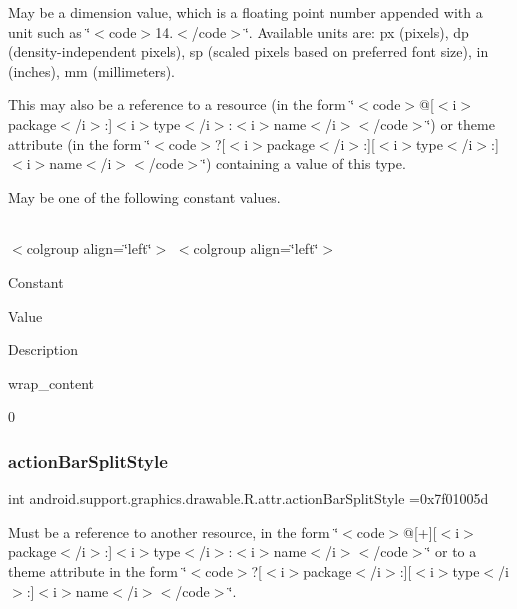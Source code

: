 May be a dimension value, which is a floating point number appended with a unit such as \char`\"{}$<$code$>$14.\+5sp$<$/code$>$\char`\"{}. Available units are\+: px (pixels), dp (density-\/independent pixels), sp (scaled pixels based on preferred font size), in (inches), mm (millimeters). 

This may also be a reference to a resource (in the form \char`\"{}$<$code$>$@\mbox{[}$<$i$>$package$<$/i$>$\+:\mbox{]}$<$i$>$type$<$/i$>$\+:$<$i$>$name$<$/i$>$$<$/code$>$\char`\"{}) or theme attribute (in the form \char`\"{}$<$code$>$?\mbox{[}$<$i$>$package$<$/i$>$\+:\mbox{]}\mbox{[}$<$i$>$type$<$/i$>$\+:\mbox{]}$<$i$>$name$<$/i$>$$<$/code$>$\char`\"{}) containing a value of this type. 

May be one of the following constant values.

\tabulinesep=1mm
\begin{longtabu} spread 0pt [c]{*{0}{|X[-1]}|}
\hline
\end{longtabu}
$<$colgroup align=\char`\"{}left\char`\"{}$>$ $<$colgroup align=\char`\"{}left\char`\"{}$>$ 

Constant

Value

Description 

{\ttfamily wrap\+\_\+content}

0\mbox{\label{classandroid_1_1support_1_1graphics_1_1drawable_1_1R_1_1attr_a21166b60d259bd01f92e065e54359fa1}} 
\subsubsection{\texorpdfstring{action\+Bar\+Split\+Style}{actionBarSplitStyle}}
{\footnotesize\ttfamily int android.\+support.\+graphics.\+drawable.\+R.\+attr.\+action\+Bar\+Split\+Style =0x7f01005d\hspace{0.3cm}{\ttfamily [static]}}

Must be a reference to another resource, in the form \char`\"{}$<$code$>$@\mbox{[}+\mbox{]}\mbox{[}$<$i$>$package$<$/i$>$\+:\mbox{]}$<$i$>$type$<$/i$>$\+:$<$i$>$name$<$/i$>$$<$/code$>$\char`\"{} or to a theme attribute in the form \char`\"{}$<$code$>$?\mbox{[}$<$i$>$package$<$/i$>$\+:\mbox{]}\mbox{[}$<$i$>$type$<$/i$>$\+:\mbox{]}$<$i$>$name$<$/i$>$$<$/code$>$\char`\"{}. \mbox{\label{classandroid_1_1support_1_1graphics_1_1drawable_1_1R_1_1attr_a63e89d71d4760c1db31cfacbff8d2e07}} 
